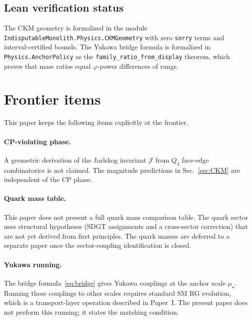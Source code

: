 \documentclass[11pt]{article}
\theoremstyle{remark}
\newcommand{\phig}{\varphi}
\newcommand{\mustar}{\mu_\star}
\begin{document}
\subsection{Lean verification status}

The CKM geometry is formalized in the module
\texttt{IndisputableMonolith.Physics.CKMGeometry} with
zero \texttt{sorry} terms and interval-certified bounds.
The Yukawa bridge formula is formalized in
\texttt{Physics.AnchorPolicy} as the
\texttt{family\_ratio\_from\_display} theorem, which
proves that mass ratios equal $\phig$-power differences of
rungs.

\section{Frontier items}
\label{sec:frontier}

This paper keeps the following items explicitly at the frontier.

\paragraph{CP-violating phase.}
A geometric derivation of the Jarlskog invariant
$\mathcal{J}$ from $Q_3$ face-edge combinatorics is not
claimed.  The magnitude predictions in Sec.~\ref{sec:CKM}
are independent of the CP phase.

\paragraph{Quark mass table.}
This paper does not present a full quark mass comparison
table.  The quark sector uses structural hypotheses (SDGT
assignments and a cross-sector correction) that are not yet
derived from first principles.  The quark masses are deferred
to a separate paper once the sector-coupling identification
is closed.

\paragraph{Yukawa running.}
The bridge formula~\eqref{eq:bridge} gives Yukawa couplings
at the anchor scale $\mustar$.  Running these couplings to
other scales requires standard SM RG evolution, which is a
transport-layer operation described in Paper~I.  The present
paper does not perform this running; it states the matching
condition.
\end{document}
